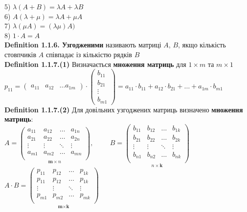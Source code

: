 \documentclass[a4paper, 10pt]{article}
\def\defin#1{\textbf{Definition {#1}}}
\theoremstyle{theoremdd}
\theoremstyle{theoremdd}
\theoremstyle{theoremdd}
\theoremstyle{theoremdd}
\theoremstyle{theoremdd}
\theoremstyle{theoremdd}
\theoremstyle{theoremdd}
\theoremstyle{theoremdd}
\begin{document}
	5) $\lambda(A+B) = \lambda A + \lambda B$\\
	6) $A (\lambda + \mu) = \lambda A + \mu A$\\
	7) $\lambda (\mu A) = (\lambda \mu) A)$\\
	8) $1 \cdot A = A$
	\bigskip \\
	\defin{1.1.6. Узгодженими} називають матриці $A$, $B$, якщо кількість стовпчиків $A$ співпадає із кількістю рядків $B$
	\bigskip \\
	\defin{1.1.7.(1)} Визначається \textbf{множення матриць} для $1 \times m$ та $m \times 1$\\
	$p_{11} = \begin{pmatrix}
	a_{11} & a_{12} & \dots a_{1m}
	\end{pmatrix} \cdot \begin{pmatrix}
	b_{11} \\ b_{21} \\ \vdots \\ b_{m1} 
	\end{pmatrix} = a_{11} \cdot b_{11} + a_{12} \cdot b_{21} + \dots + a_{1m} \cdot b_{m1}$
	\bigskip \\
	\defin{1.1.7.(2)} Для довільних узгоджених матриць визначено \textbf{множення матриць}:\\
	$A = \underset{\textbf{m} \times n}{\begin{pmatrix}
	a_{11} & a_{12} & \dots & a_{1n} \\
	a_{21} & a_{22} & \dots & a_{2n} \\
	\vdots & \vdots & \ddots & \vdots \\
	a_{m1} & a_{m2} & \dots & a_{mn} \\
	\end{pmatrix}}, \hspace{1cm} B = \underset{n \times \textbf{k}}{\begin{pmatrix}
	b_{11} & b_{12} & \dots & b_{1k} \\
    	b_{21} & b_{22} & \dots & b_{2k} \\
    	\vdots & \vdots & \ddots & \vdots \\
    	b_{n1} & b_{n2} & \dots & b_{nk} \\
	\end{pmatrix}}$\\
	$A \cdot B = \underset{\textbf{m} \times \textbf{k}}{\begin{pmatrix}
	p_{11} & p_{12} & \dots & p_{1k} \\
	p_{11} & p_{12} & \dots & p_{1k} \\
	\vdots & \vdots & \ddots & \vdots \\
	p_{m1} & p_{m2} & \dots & p_{mk} \\
	\end{pmatrix}}$\\
\end{document}
